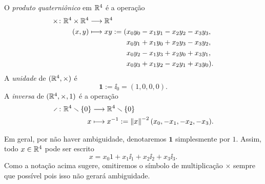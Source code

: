 \begin{definition}
O \emph{produto quaterniônico} em $\mathbb{R}^4$ é a operação
	\begin{align*}
	\func{\times}{\R^4 \times \R^4}{\R^4}{(x,y)}{
		\begin{aligned}[t]
		xy := (&x_0y_0 - x_1y_1 - x_2y_2 - x_3y_3, \\
			&x_0y_1 + x_1y_0 + x_2y_3 - x_3y_2, \\
			&x_0y_2 - x_1y_3 + x_2y_0 + x_3y_1, \\
			&x_0y_3 + x_1y_2 - x_2y_1 + x_3y_0).
		\end{aligned}
	}
	\end{align*}
A \emph{unidade} de $(\mathbb{R}^4,\times)$ é
	\begin{equation*}
	\bm 1 := \ii_0 = (1,0,0,0).
	\end{equation*}
A \emph{inversa} de $(\mathbb{R}^4,\times,1)$ é a operação
	\begin{align*}
	\func{\div}{\R^4 \setminus \{0\}}{\R^4 \setminus \{0\}}{x}{x\inv := \nor{x}^{-2} (x_0, -x_1, -x_2, -x_3)}.
	\end{align*}
\end{definition}

Em geral, por não haver ambiguidade, denotaremos $\bm 1$ simplesmente por $1$. Assim, todo $x \in \mathbb{R}^4$ pode ser escrito
	\begin{equation*}
	x = x_0 1 + x_1\ii_1 + x_2\ii_2 + x_3\ii_3.
	\end{equation*}
Como a notação acima sugere, omitiremos o símbolo de multiplicação $\times$ sempre que possível pois isso não gerará ambiguidade.%

